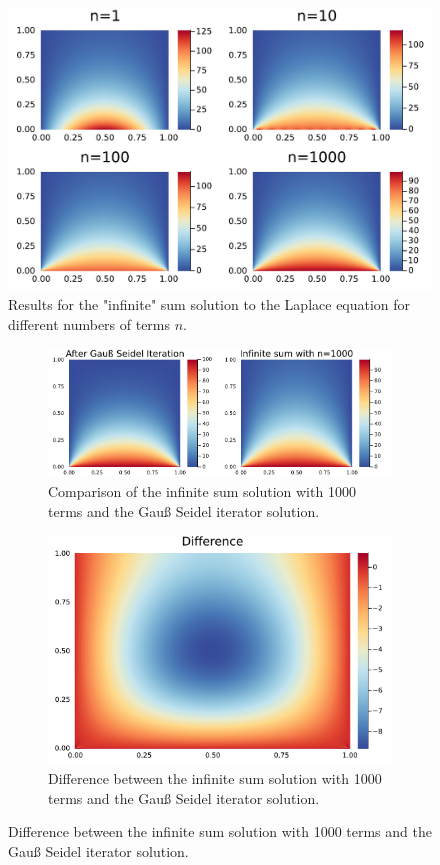 \documentclass[
	a4paper, %
	10pt, %
]{CSUniSchoolLabReport}
\begin{document}
\begin{figure}[H]
	\centering
	\includegraphics[width=\textwidth]{../saves/comp_lapplace_series_heatmap.pdf}
	\caption{Results for the "infinite" sum solution to the Laplace equation for different numbers of terms $n$.}
\end{figure}

\begin{figure}[H]
	\centering
	\begin{subfigure}[b]{\textwidth}
		\includegraphics[width=\textwidth]{../saves/comp_laplace_heatmap.pdf}
		\caption{Comparison of the infinite sum solution with 1000 terms and the Gauß Seidel iterator solution.}
	\end{subfigure}
	\hfill
	\centering
	\begin{subfigure}[b]{0.6\textwidth}
		\includegraphics[width=\textwidth]{../saves/difference_laplace_heatmap.pdf}
		\caption{Difference between the infinite sum solution with 1000 terms and the Gauß Seidel iterator solution.}
	\end{subfigure}
\end{figure}
\end{document}
